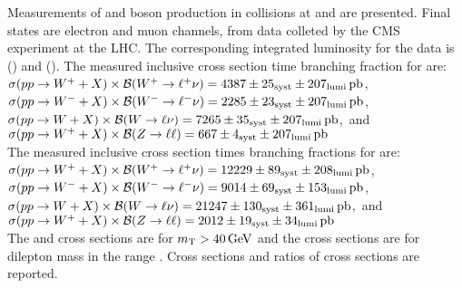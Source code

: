 % 
% 
%

Measurements of \W and \Z boson production in \pp collisions at \sg and \sh are presented. Final states are electron and muon channels, from data colleted by the CMS experiment at the LHC. The corresponding integrated luminosity for the data is \lumig (\sg) and \lumih (\sh). The measured inclusive cross section time branching fraction for \sg are: \\
$\sbrwp(\wlp) = \xsIncWlpG$,\\
$\sbrwm(\wlm) = \xsIncWlmG$,\\
$\sbrw(\wlnu) = \xsIncWlG$,~and\\ 
$\sbrz(\zll) = \xsIncZllG$\\
The measured inclusive cross section times branching fractions for \sh are:\\
$\sbrwp(\wlp) = \xsIncWlpH$,\\
$\sbrwm(\wlm) = \xsIncWlmH$,\\
$\sbrw(\wlnu) = \xsIncWlH$,~and\\ 
$\sbrz(\zll) = \xsIncZllH$\\
The \Wp and \Wm cross sections are for $\mt > 40 \GeV$ and the \Z cross sections are for dilepton mass in the range \masswindow. Cross sections and ratios of cross sections are reported. 